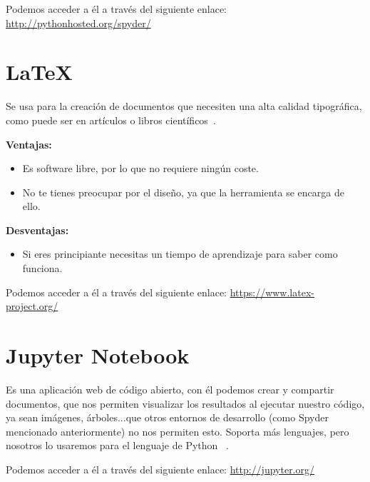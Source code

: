 Podemos acceder a él a través del siguiente enlace: 
\url{http://pythonhosted.org/spyder/}

\section{\LaTeX}
Se usa para la creación de documentos que necesiten una alta calidad tipográfica, como puede ser en artículos o libros científicos~\cite{latex}.

\textbf{Ventajas:}
\begin{itemize}
\item Es software libre, por lo que no requiere ningún coste.
\item No te tienes preocupar por el diseño, ya que la herramienta se encarga de ello.
\end{itemize}

\textbf{Desventajas:}
\begin{itemize}
\item Si eres principiante necesitas un tiempo de aprendizaje para saber como funciona.
\end{itemize}

Podemos acceder a él a través del siguiente enlace: 
\url{https://www.latex-project.org/}

\section{Jupyter Notebook}
Es una aplicación web de código abierto, con él podemos crear y compartir documentos, que nos permiten visualizar los resultados al ejecutar nuestro código, ya sean imágenes, árboles...que otros entornos de desarrollo (como Spyder mencionado anteriormente) no nos permiten esto.
Soporta más lenguajes, pero nosotros lo usaremos para el lenguaje de Python ~\cite{jupyter}.

Podemos acceder a él a través del siguiente enlace: 
\url{http://jupyter.org/}	